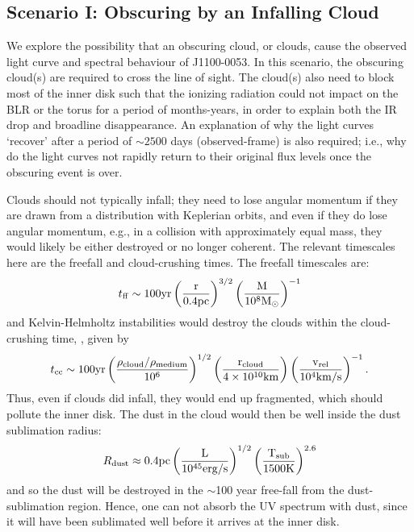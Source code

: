 \documentclass[11pt,a4paper]{article}
\begin{document}
\subsection*{Scenario I: Obscuring by an Infalling Cloud}
We explore the possibility that an obscuring cloud, or clouds, cause
the observed light curve and spectral behaviour of J1100-0053.  In
this scenario, the obscuring cloud(s) are required to cross the line
of sight. The cloud(s) also need to block most of the inner disk such
that the ionizing radiation could not impact on the BLR or the torus
for a period of months-years, in order to explain both the IR drop and
broadline disappearance. An explanation of why the light curves
`recover' after a period of $\sim 2500$ days (observed-frame) is also
required; i.e., why do the light curves not rapidly return to their
original flux levels once the obscuring event is over.

Clouds should not typically infall; they need to lose angular momentum
if they are drawn from a distribution with Keplerian orbits, and even
if they do lose angular momentum, e.g., in a collision with
approximately equal mass, they would likely be either destroyed or no
longer coherent. The relevant timescales here are the freefall and
cloud-crushing times. The freefall timescales are:
\begin{equation}
    t_{{\rm ff}}   \sim 100   \rm{yr}  \left(\frac{r}{0.4\rm{pc}}\right)^{3/2} 
                                            \left(\frac{M}{10^{8}M_{\odot}}\right)^{-1}
\end{equation}
and Kelvin-Helmholtz instabilities would destroy the clouds within the
cloud-crushing time, \citep[e.g., ][]{Nagakura2008, Hopkins2013,
Shiokawa2015, Bae2016}, given by
\begin{equation}
    t_{\rm cc} \sim 100\rm{yr} \left(\frac{\rho_{cloud}/\rho_{medium}}{10^{6}}\right)^{1/2} 
                                            \left(\frac{r_{\rm cloud}}{4 \times 10^{10}\rm{km}}\right) 
                                            \left(\frac{v_{\rm rel}}{10^{4}\rm{km/s}}\right)^{-1}.
\end{equation}
Thus, even if clouds did infall, they would end up fragmented, which
should pollute the inner disk.  The dust in the cloud would then be
well inside the dust sublimation radius:
\begin{equation}
    R_{\rm dust} \approx 0.4\rm{pc}\left(\frac{L}{10^{45}\rm{erg/s}}\right)^{1/2}
                                                   \left(\frac{T_{\rm sub}}{1500\rm{K}}\right)^{2.6}
\end{equation}
and so the dust will be destroyed in the $\sim$100 year free-fall from
the dust-sublimation region. Hence, one can not absorb the UV spectrum
with dust, since it will have been sublimated well before it arrives
at the inner disk.
\end{document}
